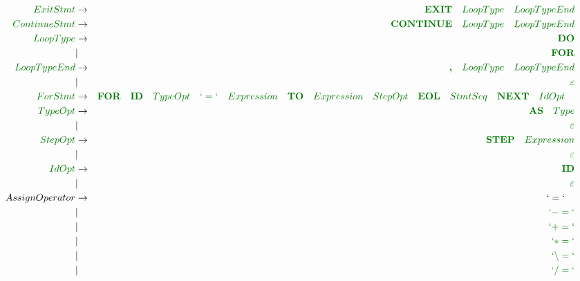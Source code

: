 \documentclass[a4paper,11pt,leqno]{article}
\begin{document}
\begin{landscape}
\begin{eqnarray}
\textcolor{green1}{ExitStmt} & \rightarrow & \textcolor{green1}{\textbf{EXIT}\quad LoopType\quad LoopTypeEnd}	\\
\textcolor{green1}{ContinueStmt} & \rightarrow & \textcolor{green1}{\textbf{CONTINUE}\quad LoopType\quad LoopTypeEnd}	\\
\textcolor{green1}{LoopType} & \rightarrow & \textcolor{green1}{\textbf{DO}}\\
&	|		&	\textcolor{green1}{\textbf{FOR}}   \\
\textcolor{green1}{LoopTypeEnd} & \rightarrow & \textcolor{green1}{\textbf{,}\quad LoopType \quad LoopTypeEnd}\\
&	|		&	\textcolor{green1}{\varepsilon}   \\
\textcolor{green1}{ForStmt} &	 \rightarrow	&  \textcolor{green1}{\textbf{FOR}\quad \textbf{ID}\quad TypeOpt\quad `=`\quad Expression\quad \textbf{TO}\quad Expression\quad StepOpt\quad \textbf{EOL}\quad StmtSeq\quad \textbf{NEXT}\quad IdOpt\quad} \\
\textcolor{green1}{TypeOpt} & \rightarrow  & \textcolor{green1}{\textbf{AS}\quad Type} \\
& | &	\textcolor{green1}{\varepsilon} \\
\textcolor{green1}{StepOpt} & \rightarrow  & \textcolor{green1}{\textbf{STEP}\quad Expression} \\
& | &	\textcolor{green1}{\varepsilon} \\
\textcolor{green1}{IdOpt}	& \rightarrow & \textcolor{green1}{\textbf{ID}} \\
		& | &  \textcolor{green1}{\varepsilon} \\
AssignOperator	&	 \rightarrow	&	 `=` \quad		\\
		&	|		&	\textcolor{green1}{`-=`}	\\
		&	|		&	\textcolor{green1}{`+=`}	\\
		&	|		&	\textcolor{green1}{`*=`}	\\
		&	|		&	\textcolor{green1}{`\backslash =`} \\
		&	|		&	\textcolor{green1}{`/=`}	\\
\end{eqnarray}


\end{landscape}
\end{document}
